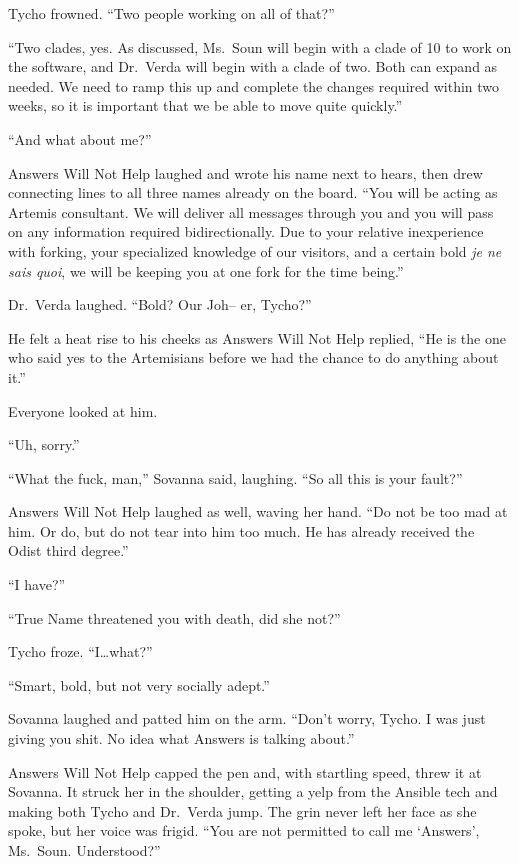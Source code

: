 Tycho frowned. ``Two people working on all of that?''

``Two clades, yes. As discussed, Ms.~Soun will begin with a clade of 10 to work on the software, and Dr.~Verda will begin with a clade of two. Both can expand as needed. We need to ramp this up and complete the changes required within two weeks, so it is important that we be able to move quite quickly.''

``And what about me?''

Answers Will Not Help laughed and wrote his name next to hears, then drew connecting lines to all three names already on the board. ``You will be acting as Artemis consultant. We will deliver all messages through you and you will pass on any information required bidirectionally. Due to your relative inexperience with forking, your specialized knowledge of our visitors, and a certain bold \emph{je ne sais quoi}, we will be keeping you at one fork for the time being.''

Dr.~Verda laughed. ``Bold? Our Joh-- er, Tycho?''

He felt a heat rise to his cheeks as Answers Will Not Help replied, ``He is the one who said yes to the Artemisians before we had the chance to do anything about it.''

Everyone looked at him.

``Uh, sorry.''

``What the fuck, man,'' Sovanna said, laughing. ``So all this is your fault?''

Answers Will Not Help laughed as well, waving her hand. ``Do not be too mad at him. Or do, but do not tear into him too much. He has already received the Odist third degree.''

``I have?''

``True Name threatened you with death, did she not?''

Tycho froze. ``I\ldots what?''

``Smart, bold, but not very socially adept.''

Sovanna laughed and patted him on the arm. ``Don't worry, Tycho. I was just giving you shit. No idea what Answers is talking about.''

Answers Will Not Help capped the pen and, with startling speed, threw it at Sovanna. It struck her in the shoulder, getting a yelp from the Ansible tech and making both Tycho and Dr.~Verda jump. The grin never left her face as she spoke, but her voice was frigid. ``You are not permitted to call me `Answers', Ms.~Soun. Understood?''

